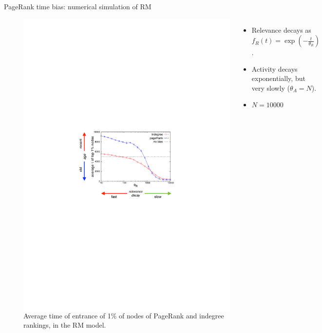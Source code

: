 \begin{frame}{PageRank time bias: numerical simulation of RM}
    \begin{figure}
        \begin{columns}
                \includegraphics[width=1.0\textwidth]{figures/PageRank_time_bias}
                \begin{footnotesize}
                \begin{itemize}
                    \item Relevance decays as $f_R(t) = \exp(-\frac{t}{\theta_R})$.
                    \item Activity decays exponentially, but very slowly ($\theta_A=N$).
                    \item $N=10000$
                \end{itemize}
                \end{footnotesize}
    \end{columns}
    \caption{Average time of entrance of 1\% of nodes of PageRank and indegree rankings, in the RM model.}
    \end{figure}
\end{frame}

